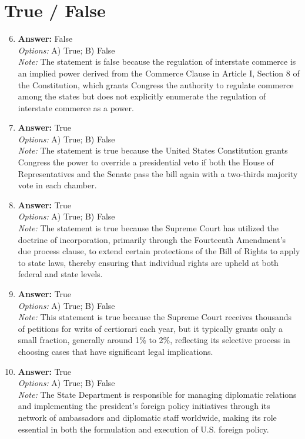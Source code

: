 \documentclass[12pt]{article}
\begin{document}
\section*{True / False}
\begin{enumerate}[label=\arabic*.]
\setcounter{enumi}{5}
\item \textbf{Answer:} False
\\ \textit{Options:} A) True; B) False
\\ \textit{Note:} The statement is false because the regulation of interstate commerce is an implied power derived from the Commerce Clause in Article I, Section 8 of the Constitution, which grants Congress the authority to regulate commerce among the states but does not explicitly enumerate the regulation of interstate commerce as a power.
\item \textbf{Answer:} True
\\ \textit{Options:} A) True; B) False
\\ \textit{Note:} The statement is true because the United States Constitution grants Congress the power to override a presidential veto if both the House of Representatives and the Senate pass the bill again with a two-thirds majority vote in each chamber.
\item \textbf{Answer:} True
\\ \textit{Options:} A) True; B) False
\\ \textit{Note:} The statement is true because the Supreme Court has utilized the doctrine of incorporation, primarily through the Fourteenth Amendment's due process clause, to extend certain protections of the Bill of Rights to apply to state laws, thereby ensuring that individual rights are upheld at both federal and state levels.
\item \textbf{Answer:} True
\\ \textit{Options:} A) True; B) False
\\ \textit{Note:} This statement is true because the Supreme Court receives thousands of petitions for writs of certiorari each year, but it typically grants only a small fraction, generally around 1\% to 2\%, reflecting its selective process in choosing cases that have significant legal implications.
\item \textbf{Answer:} True
\\ \textit{Options:} A) True; B) False
\\ \textit{Note:} The State Department is responsible for managing diplomatic relations and implementing the president's foreign policy initiatives through its network of ambassadors and diplomatic staff worldwide, making its role essential in both the formulation and execution of U.S. foreign policy.
\end{enumerate}
\end{document}

